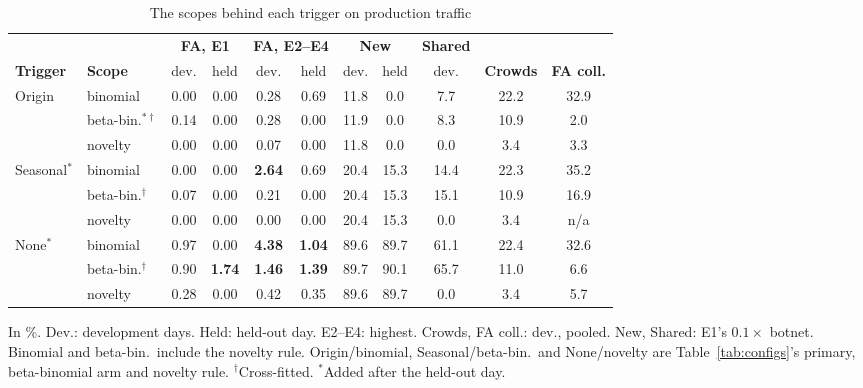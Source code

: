 \documentclass[conference,letterpaper,10pt]{IEEEtran}
\newcommand\1{\textit{(i)}}
\newcommand\2{\textit{(ii)}}
\newcommand\3{\textit{(iii)}}
\newcommand\4{\textit{(iv)}}
\newcommand\5{\textit{(v)}}
\newcommand\6{\textit{(vi)}}
\newcommand\7{\textit{(vii)}}
\newcommand\8{\textit{(viii)}}
\newcommand\9{\textit{(ix)}}
\begin{document}
\begin{table}[t]
\centering
\caption{The scopes behind each trigger on production traffic}
\label{tab:triggers}
\scriptsize
\setlength{\tabcolsep}{1.8pt}
\begin{tabular}{@{}llccccccccc@{}}
\toprule
 & & \multicolumn{2}{c}{\textbf{FA, E1}} & \multicolumn{2}{c}{\textbf{FA, E2--E4}} & \multicolumn{2}{c}{\textbf{New}} & \textbf{Shared} & & \\
\cmidrule(lr){3-4}\cmidrule(lr){5-6}\cmidrule(lr){7-8}\cmidrule(lr){9-9}
\textbf{Trigger} & \textbf{Scope} & dev. & held & dev. & held & dev. & held & dev. & \textbf{Crowds} & \textbf{FA coll.} \\
\midrule
Origin              & binomial               & 0.00 & 0.00 & 0.28 & 0.69 & 11.8 & 0.0  & 7.7  & 22.2 & 32.9 \\
                    & beta-bin.$^{*\dagger}$ & 0.14 & 0.00 & 0.28 & 0.00 & 11.9 & 0.0  & 8.3  & 10.9 & 2.0 \\
                    & novelty                & 0.00 & 0.00 & 0.07 & 0.00 & 11.8 & 0.0  & 0.0  & 3.4  & 3.3 \\
\rowcolor[gray]{0.90}
Seasonal$^{*}$      & binomial               & 0.00 & 0.00 & \textbf{2.64} & 0.69 & 20.4 & 15.3 & 14.4 & 22.3 & 35.2 \\
\rowcolor[gray]{0.90}
                    & beta-bin.$^{\dagger}$  & 0.07 & 0.00 & 0.21 & 0.00 & 20.4 & 15.3 & 15.1 & 10.9 & 16.9 \\
\rowcolor[gray]{0.90}
                    & novelty                & 0.00 & 0.00 & 0.00 & 0.00 & 20.4 & 15.3 & 0.0  & 3.4  & n/a \\
None$^{*}$          & binomial               & 0.97 & 0.00 & \textbf{4.38} & \textbf{1.04} & 89.6 & 89.7 & 61.1 & 22.4 & 32.6 \\
                    & beta-bin.$^{\dagger}$  & 0.90 & \textbf{1.74} & \textbf{1.46} & \textbf{1.39} & 89.7 & 90.1 & 65.7 & 11.0 & 6.6 \\
                    & novelty                & 0.28 & 0.00 & 0.42 & 0.35 & 89.6 & 89.7 & 0.0  & 3.4  & 5.7 \\
\bottomrule
\end{tabular}

\vspace{2pt}
\begin{minipage}{\linewidth}\footnotesize In \%. Dev.: development days. Held: held-out day. E2--E4: highest. Crowds, FA coll.: dev., pooled. New, Shared: E1's $0.1\times$ botnet. Binomial and beta-bin.\ include the novelty rule. Origin/binomial, Seasonal/beta-bin.\ and None/novelty are Table~\ref{tab:configs}'s primary, beta-binomial arm and novelty rule. $^{\dagger}$Cross-fitted. $^{*}$Added after the held-out day.\end{minipage}
\end{table}
\end{document}
